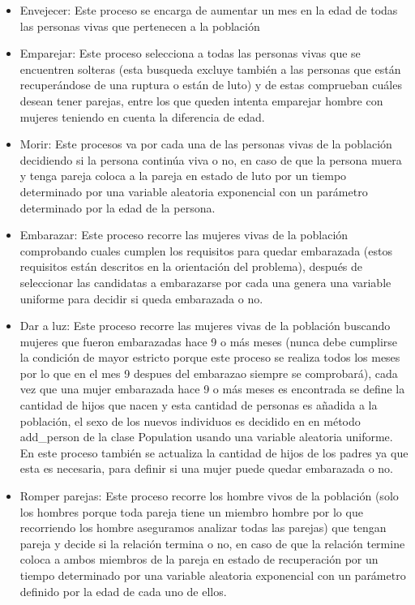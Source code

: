 \documentclass[12pt]{article}
\begin{document}
\begin{itemize}
    \item Envejecer:
    \newline
    Este proceso se encarga de aumentar un mes en la edad de todas las personas vivas que pertenecen a la poblaci\'on
    \item Emparejar:
    \newline
    Este proceso selecciona a todas las personas vivas que se encuentren solteras (esta busqueda excluye tambi\'en a las personas que est\'an recuper\'andose de una ruptura o est\'an de luto) y de estas comprueban cu\'ales desean tener parejas,
    entre los que queden intenta emparejar hombre con mujeres teniendo en cuenta la diferencia de edad.
    \item Morir:
    \newline
    Este procesos va por cada una de las personas vivas de la poblaci\'on decidiendo si la persona contin\'ua viva o no, en caso de que la persona muera y tenga pareja coloca a la pareja en estado de luto por un tiempo determinado por una variable aleatoria 
    exponencial con un par\'ametro determinado por la edad de la persona.
    \item Embarazar:
    \newline
    Este proceso recorre las mujeres vivas de la poblaci\'on comprobando cuales cumplen los requisitos para quedar embarazada (estos requisitos est\'an descritos en la orientaci\'on del problema),
    despu\'es de seleccionar las candidatas a embarazarse por cada una genera una variable uniforme para decidir si queda embarazada o no.
    \item Dar a luz:
    \newline
    Este proceso recorre las mujeres vivas de la poblaci\'on buscando mujeres que fueron embarazadas hace 9 o m\'as meses (nunca debe cumplirse la condici\'on de mayor estricto porque este proceso se realiza todos los meses por lo que en el mes 9 despues del embarazao siempre se comprobar\'a),
    cada vez que una mujer embarazada hace 9 o m\'as meses es encontrada se define la cantidad de hijos que nacen y esta cantidad de personas es a\~nadida a la poblaci\'on, el sexo de los nuevos 
    individuos es decidido en en m\'etodo add\_person de la clase Population usando una variable aleatoria uniforme. En este proceso tambi\'en se actualiza la cantidad de hijos de los padres ya que esta es necesaria,
    para definir si una mujer puede quedar embarazada o no.
    \item Romper parejas:
    \newline
    Este proceso recorre los hombre vivos de la poblaci\'on (solo los hombres porque toda pareja tiene un miembro hombre por lo que recorriendo los hombre aseguramos analizar todas las parejas) que tengan pareja y decide si la relaci\'on termina o no,
     en caso de que la relaci\'on termine coloca a ambos miembros de la pareja en estado de recuperaci\'on por un tiempo determinado por una variable aleatoria exponencial con un par\'ametro definido por la edad de cada uno de ellos.
    
\end{itemize}
\end{document}
